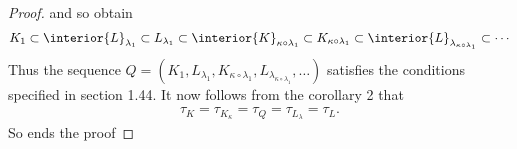 \begin{proof}
and so obtain
%
  \begin{align}
    K_1 
      \subset 
    \interior{L}_{\lambda_1} 
      \subset 
    L_{\lambda_1} 
      \subset 
    \interior{K}_{\kappa\circ\lambda_1}
      \subset 
    K_{\kappa\circ\lambda_1}
      \subset
    \interior{L}_{\lambda_{\kappa\circ\lambda_1}}
      \subset
    \cdots
  \end{align}
%
Thus the sequence 
%
  $Q = (
    K_1, 
    L_{\lambda_1}, 
    K_{\kappa\circ\lambda_1}, 
    L_{\lambda_{\kappa\circ\lambda_1}},
    \dots
  )$
%
satisfies the conditions specified in section 1.44. 
It now follows from the corollary 2 that 
%
  \begin{align}  
    \tau_{K} 
    = 
      \tau_{K_\kappa} 
    = 
      \tau_{Q} 
    = 
      \tau_{L_\lambda} 
    = \tau_{L}.
  \end{align} 
%
So ends the proof
\end{proof}
